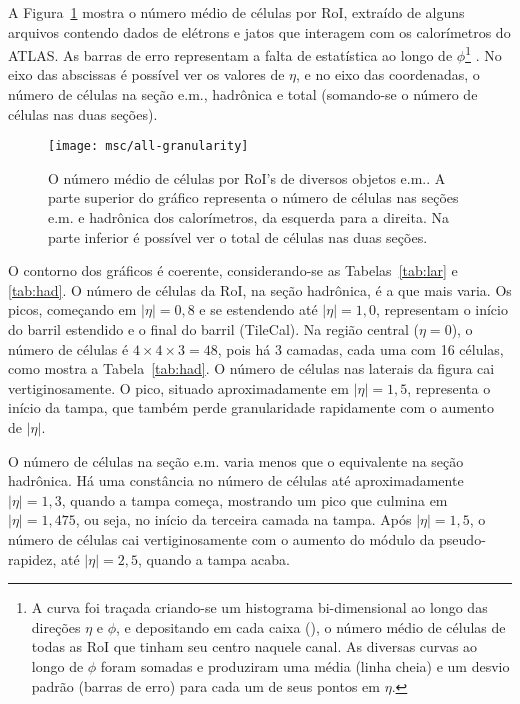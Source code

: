 A Figura~\ref{fig:ncell} mostra o número médio de células por RoI, extraído de
alguns arquivos contendo dados de elétrons e jatos que interagem com os
calorímetros do ATLAS. As barras de erro representam a falta de estatística ao
longo de $\phi$\footnote{A curva foi traçada criando-se um histograma
bi-dimensional ao longo das direções $\eta$ e $\phi$, e depositando em cada
caixa (), o número médio de células de todas as RoI que tinham seu
centro naquele canal. As diversas curvas ao longo de $\phi$ foram somadas e
produziram uma média (linha cheia) e um desvio padrão (barras de erro) para
cada um de seus pontos em $\eta$.} . No eixo das abscissas é possível ver os
valores de $\eta$, e no eixo das coordenadas, o número de células na seção
e.m., hadrônica e total (somando-se o número de células nas duas seções).

\begin{figure}
\begin{center}
\texttt{[image: msc/all-granularity]}
\end{center}
\caption[O número médio de células por RoI's de diversos objetos e.m..]{O número
médio de células por RoI's de diversos objetos e.m.. A parte superior do
gráfico representa o número de células nas seções e.m. e hadrônica dos
calorímetros, da esquerda para a direita. Na parte inferior é possível ver o
total de células nas duas seções.}
\label{fig:ncell}
\end{figure}

O contorno dos gráficos é coerente, considerando-se as Tabelas~\ref{tab:lar} e
\ref{tab:had}. O número de células da RoI, na seção hadrônica, é a que mais
varia. Os picos, começando em $|\eta|=0,8$ e se estendendo até $|\eta|=1,0$,
representam o início do barril estendido e o final do barril (TileCal). Na
região central ($\eta=0$), o número de células é $4\times4\times3=48$, pois há
3 camadas, cada uma com 16 células, como mostra a Tabela~\ref{tab:had}. O
número de células nas laterais da figura cai vertiginosamente. O pico, situado
aproximadamente em $|\eta|=1,5$, representa o início da tampa, que também
perde granularidade rapidamente com o aumento de $|\eta|$.

O número de células na seção e.m. varia menos que o equivalente na seção
hadrônica. Há uma constância no número de células até aproximadamente
$|\eta|=1,3$, quando a tampa começa, mostrando um pico que culmina em
$|\eta|=1,475$, ou seja, no início da terceira camada na tampa. Após
$|\eta|=1,5$, o número de células cai vertiginosamente com o aumento do módulo
da pseudo-rapidez, até $|\eta|=2,5$, quando a tampa acaba.

